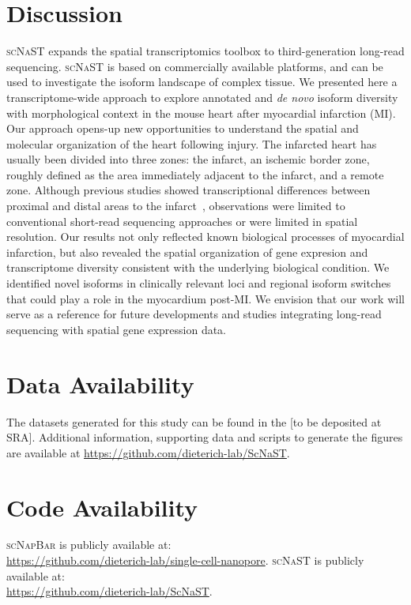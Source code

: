 \documentclass[utf8]{FrontiersinHarvard} %
\newcommand{\denovo}{\textit{de novo}\xspace}
\newcommand{\scn}{\textsc{scNapBar}\xspace}
\newcommand{\scnast}{\textsc{scNaST}\xspace}
\begin{document}
\section*{Discussion}
\scnast expands the spatial transcriptomics toolbox to third-generation long-read sequencing.
\scnast is based on commercially available platforms, and can be used to investigate the isoform landscape of complex tissue.
We presented here a transcriptome-wide approach to explore annotated and \denovo isoform diversity with morphological context in the mouse heart after myocardial infarction (MI).
Our approach opens-up new opportunities to understand the spatial and molecular organization of the heart following injury.
The infarcted heart has usually been divided into three zones: the infarct, an ischemic border zone, roughly defined as the area immediately adjacent to the infarct, and a remote zone. 
Although previous studies showed transcriptional differences between proximal and distal areas to the infarct~\citep{Duijvenboden2019:Nppb_BZ}, observations were limited to conventional short-read sequencing approaches or were limited in spatial resolution.
Our results not only reflected known biological processes of myocardial infarction, but also revealed the spatial organization of gene expresion and transcriptome diversity consistent with the underlying biological condition.
We identified novel isoforms in clinically relevant loci and regional isoform switches that could play a role in the myocardium post-MI.
We envision that our work will serve as a reference for future developments and studies integrating long-read sequencing with spatial gene expression data.



\section*{Data Availability}
The datasets generated for this study can be found in the [to be deposited at SRA].
Additional information, supporting data and scripts to generate the figures are available at \url{https://github.com/dieterich-lab/ScNaST}.

\section*{Code Availability}
\scn is publicly available at:\\ \url{https://github.com/dieterich-lab/single-cell-nanopore}.
\scnast is publicly available at:\\ \url{https://github.com/dieterich-lab/ScNaST}.
\end{document}
